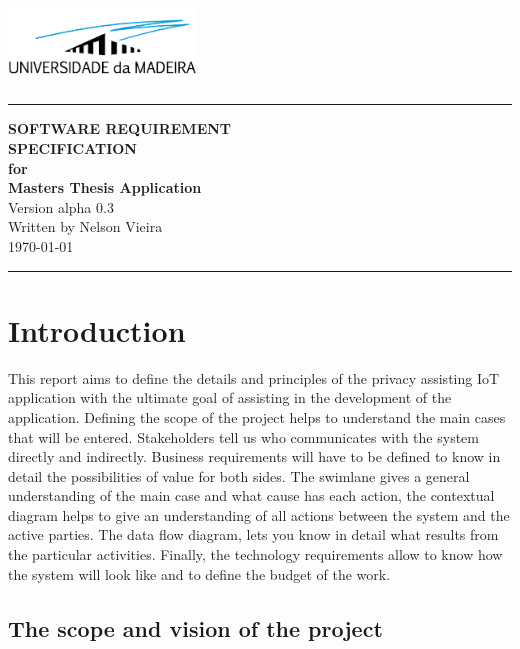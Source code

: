 \documentclass{scrreprt}
\date{}
\begin{document}
\begin{flushright}
    \includegraphics[width=5cm]{../../thesis/assets/images/uma_logo.png}
    \rule{16cm}{5pt}\vskip1cm
    \Huge{\textbf{\uppercase{Software Requirement}} \\ \textbf{\uppercase{Specification}}} \\
    \vspace{1cm}
    \textbf{for} \\
    \vspace{1cm}
    \textbf{Masters Thesis Application} \\
    \vspace{2cm}
    \LARGE{Version alpha 0.3 \\}
    \vspace{2cm}
    Written by Nelson Vieira \\
    \vspace{2cm}
    \today
    \vfill
    \rule{16cm}{5pt}
\end{flushright}

\tableofcontents

\chapter{Introduction}

This report aims to define the details and principles of the privacy assisting
IoT application with the ultimate goal of assisting in the development
of the application. Defining the scope of the project helps to understand
the main cases that will be entered. Stakeholders tell us who communicates
with the system directly and indirectly. Business requirements will have
to be defined to know in detail the possibilities of value for both sides.
The swimlane gives a general understanding of the main case and what cause
has each action, the contextual diagram helps to give an understanding
of all actions between the system and the active parties. The data flow
diagram, lets you know in detail what results from the particular activities.
Finally, the technology requirements allow to know how the system will
look like and to define the budget of the work.

\section{The scope and vision of the project}
\end{document}
